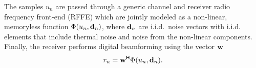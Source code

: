 The samples $u_n$ are passed through a generic channel and receiver radio frequency front-end 
(RFFE) which are jointly modeled as a non-linear, memoryless function $\Phi(u_n, {\mathbf{d}}_n)$, where ${\mathbf{d}}_n$ are i.i.d.\ noise vectors with i.i.d. elements that include thermal noise
and noise from the non-linear components. Finally, the receiver performs digital beamforming using the vector ${\mathbf{w}}$
\begin{equation}
    r_n = {\mathbf{w}}^{\text{\sf H}}\Phi(u_n, {\mathbf{d}}_n).
\end{equation}